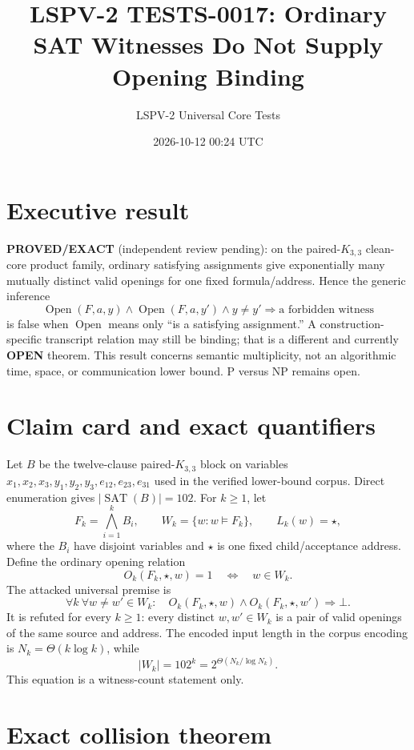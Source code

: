 \documentclass[11pt]{article}
\title{LSPV-2 TESTS-0017: Ordinary SAT Witnesses Do Not Supply Opening Binding}
\author{LSPV-2 Universal Core Tests}
\date{2026-10-12 00:24 UTC}
\newcommand{\status}[1]{\textbf{#1}}
\begin{document}
\maketitle

\section*{Executive result}

\status{PROVED/EXACT} (independent review pending): on the paired-$K_{3,3}$ clean-core product family, ordinary satisfying assignments give exponentially many mutually distinct valid openings for one fixed formula/address.  Hence the generic inference
\[
  \operatorname{Open}(F,a,y)\wedge \operatorname{Open}(F,a,y')\wedge y\ne y'
  \Longrightarrow \text{a forbidden witness}
\]
is false when $\operatorname{Open}$ means only ``is a satisfying assignment.''  A construction-specific transcript relation may still be binding; that is a different and currently \status{OPEN} theorem.  This result concerns semantic multiplicity, not an algorithmic time, space, or communication lower bound.  P versus NP remains open.

\section*{Claim card and exact quantifiers}

Let $B$ be the twelve-clause paired-$K_{3,3}$ block on variables
$x_1,x_2,x_3,y_1,y_2,y_3,e_{12},e_{23},e_{31}$ used in the verified lower-bound corpus.  Direct enumeration gives
$|\operatorname{SAT}(B)|=102$.  For $k\geq1$, let
\[
 F_k=\bigwedge_{i=1}^{k} B_i,
 \qquad W_k=\{w:w\models F_k\},
 \qquad L_k(w)=\star,
\]
where the $B_i$ have disjoint variables and $\star$ is one fixed child/acceptance address.  Define the ordinary opening relation
\[
  O_k(F_k,\star,w)=1\quad\Longleftrightarrow\quad w\in W_k.
\]
The attacked universal premise is
\[
  \forall k\ \forall w\ne w'\in W_k:\quad
  O_k(F_k,\star,w)\wedge O_k(F_k,\star,w')
  \Longrightarrow \bot.
\]
It is refuted for every $k\geq1$: every distinct $w,w'\in W_k$ is a pair of valid openings of the same source and address.  The encoded input length in the corpus encoding is $N_k=\Theta(k\log k)$, while
\[
  |W_k|=102^k=2^{\Theta(N_k/\log N_k)}.
\]
This equation is a witness-count statement only.

\section*{Exact collision theorem}
\end{document}
